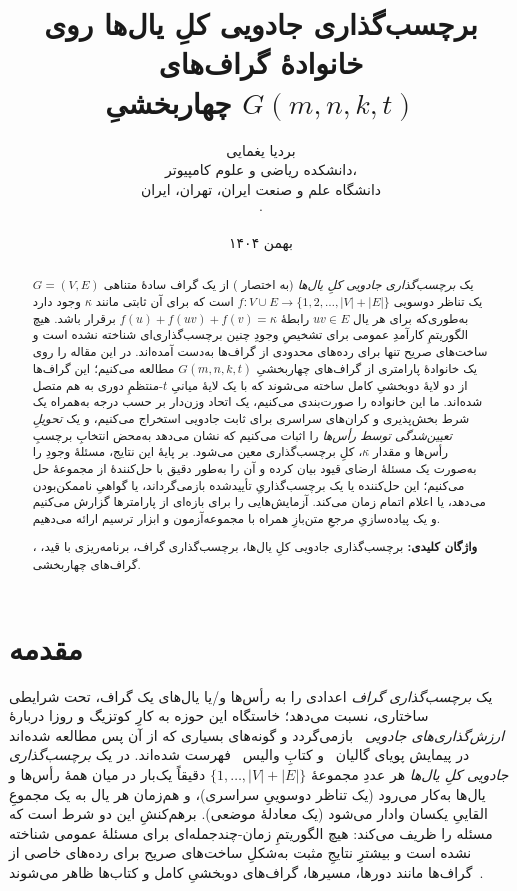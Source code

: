 \documentclass[11pt,a4paper]{article}
\title{\textbf{برچسب‌گذاری جادویی کلِ یال‌ها روی خانوادهٔ گراف‌های\\ چهاربخشیِ $G(m,n,k,t)$}}
\author{
  بردیا یغمایی\\[2pt]
  \small دانشکده ریاضی و علوم کامپیوتر،\\
  \small دانشگاه علم و صنعت ایران، تهران، ایران\\
  \small \en{\href{mailto:bardia_yaghmaie@mathdep.iust.ac.ir}{bardia\_yaghmaie@mathdep.iust.ac.ir}} $\cdot$ \en{\href{mailto:yaghmaiebardia@gmail.com}{yaghmaiebardia@gmail.com}}
}
\date{بهمن ۱۴۰۴}
\newcommand{\en}[1]{\lr{{\enfont #1}}}
\newcommand{\km}{\kappa}
\newcommand{\Gfam}{G(m,n,k,t)}
\theoremstyle{plain}
\theoremstyle{definition}
\theoremstyle{remark}
\begin{document}
\maketitle

\begin{abstract}
\noindent
یک \emph{برچسب‌گذاری جادویی کلِ یال‌ها} (به اختصار \en{EMTL}) از یک گراف سادهٔ متناهی
$G=(V,E)$ یک تناظر دوسویی $f\colon V\cup E\to\{1,2,\dots,|V|+|E|\}$ است که برای آن
ثابتی مانند $\km$ وجود دارد به‌طوری‌که برای هر یال $uv\in E$ رابطهٔ
$f(u)+f(uv)+f(v)=\km$ برقرار باشد. هیچ الگوریتمِ کارآمدِ عمومی برای تشخیصِ وجودِ چنین
برچسب‌گذاری‌ای شناخته نشده است و ساخت‌های صریح تنها برای رده‌های محدودی از
گراف‌ها به‌دست آمده‌اند. در این مقاله \en{EMTL} را روی یک خانوادهٔ پارامتری از
گراف‌های چهاربخشیِ $\Gfam$ مطالعه می‌کنیم؛ این گراف‌ها از دو لایهٔ دوبخشیِ کامل ساخته
می‌شوند که با یک لایهٔ میانیِ $t$-منتظمِ دوری به هم متصل شده‌اند. ما این خانواده را
صورت‌بندی می‌کنیم، یک اتحاد وزن‌دار بر حسب درجه به‌همراه یک شرط بخش‌پذیری و کران‌های
سراسری برای ثابت جادویی استخراج می‌کنیم، و یک \emph{تحویلِ تعیین‌شدگی توسط رأس‌ها} را
اثبات می‌کنیم که نشان می‌دهد به‌محض انتخابِ برچسبِ رأس‌ها و مقدار $\km$، کلِ
برچسب‌گذاری معین می‌شود. بر پایهٔ این نتایج، مسئلهٔ وجودِ \en{EMTL} را به‌صورت یک
مسئلهٔ ارضای قیود بیان کرده و آن را به‌طور دقیق با حل‌کنندهٔ \en{CP-SAT} از مجموعهٔ
\en{OR-Tools} حل می‌کنیم؛ این حل‌کننده یا یک برچسب‌گذاریِ تأییدشده بازمی‌گرداند، یا
گواهیِ ناممکن‌بودن می‌دهد، یا اعلام اتمام زمان می‌کند. آزمایش‌هایی را برای بازه‌ای از
پارامترها گزارش می‌کنیم و یک پیاده‌سازیِ مرجعِ متن‌بازِ همراه با مجموعه‌آزمون و
ابزار ترسیم ارائه می‌دهیم.

\medskip
\noindent\textbf{واژگان کلیدی:} برچسب‌گذاری جادویی کلِ یال‌ها، برچسب‌گذاری گراف،
برنامه‌ریزی با قید، \en{CP-SAT}، گراف‌های چهاربخشی.
\end{abstract}

\section{مقدمه}\label{sec:intro}

یک \emph{برچسب‌گذاری گراف} اعدادی را به رأس‌ها و/یا یال‌های یک گراف، تحت شرایطی
ساختاری، نسبت می‌دهد؛ خاستگاه این حوزه به کارِ کوتزیگ و روزا دربارهٔ \emph{ارزش‌گذاری‌های
جادویی}~\cite{kotzig-rosa} بازمی‌گردد و گونه‌های بسیاری که از آن پس مطالعه شده‌اند در
پیمایش پویای گالیان~\cite{gallian} و کتابِ والیس~\cite{wallis} فهرست شده‌اند. در یک
\emph{برچسب‌گذاری جادویی کلِ یال‌ها} هر عددِ مجموعهٔ $\{1,\dots,|V|+|E|\}$ دقیقاً یک‌بار
در میان همهٔ رأس‌ها و یال‌ها به‌کار می‌رود (یک تناظر دوسوییِ سراسری)، و هم‌زمان هر یال
به یک مجموعِ القاییِ یکسان وادار می‌شود (یک معادلهٔ موضعی). برهم‌کنشِ این دو شرط است
که مسئله را ظریف می‌کند: هیچ الگوریتمِ زمان-چندجمله‌ای برای مسئلهٔ عمومی شناخته نشده
است و بیشترِ نتایجِ مثبت به‌شکلِ ساخت‌های صریح برای رده‌های خاصی از گراف‌ها مانند دورها،
مسیرها، گراف‌های دوبخشیِ کامل و کتاب‌ها ظاهر می‌شوند~\cite{kotzig-rosa,wbms,gallian,kite}.
\end{document}

